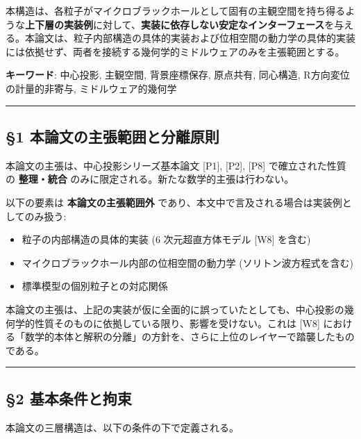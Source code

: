 \documentclass[
  a4paper,11pt]{ltjsarticle}
\providecommand{\tightlist}{%
  \setlength{\itemsep}{0pt}\setlength{\parskip}{0pt}}
\begin{document}
本構造は、各粒子がマイクロブラックホールとして固有の主観空間を持ち得るような\textbf{上下層の実装例}に対して、\textbf{実装に依存しない安定なインターフェース}を与える。本論文は、粒子内部構造の具体的実装および位相空間の動力学の具体的実装には依拠せず、両者を接続する幾何学的ミドルウェアのみを主張範囲とする。

\textbf{キーワード}: 中心投影, 主観空間, 背景座標保存, 原点共有,
同心構造, R方向変位の計量的非寄与, ミドルウェア的幾何学

\begin{center}\rule{0.5\linewidth}{0.5pt}\end{center}

\subsection{§1
本論文の主張範囲と分離原則}\label{ux672cux8ad6ux6587ux306eux4e3bux5f35ux7bc4ux56f2ux3068ux5206ux96e2ux539fux5247}

本論文の主張は、中心投影シリーズ基本論文 {[}P1{]}, {[}P2{]}, {[}P8{]}
で確立された性質の \textbf{整理・統合}
のみに限定される。新たな数学的主張は行わない。

以下の要素は \textbf{本論文の主張範囲外}
であり、本文中で言及される場合は実装例としてのみ扱う:

\begin{itemize}
\tightlist
\item
  粒子の内部構造の具体的実装 (6 次元超直方体モデル {[}W8{]} を含む)
\item
  マイクロブラックホール内部の位相空間の動力学 (ソリトン波方程式を含む)
\item
  標準模型の個別粒子との対応関係
\end{itemize}

本論文の主張は、上記の実装が仮に全面的に誤っていたとしても、中心投影の幾何学的性質そのものに依拠している限り、影響を受けない。これは
{[}W8{]}
における「数学的本体と解釈の分離」の方針を、さらに上位のレイヤーで踏襲したものである。

\begin{center}\rule{0.5\linewidth}{0.5pt}\end{center}

\subsection{§2
基本条件と拘束}\label{ux57faux672cux6761ux4ef6ux3068ux62d8ux675f}

本論文の三層構造は、以下の条件の下で定義される。
\end{document}
